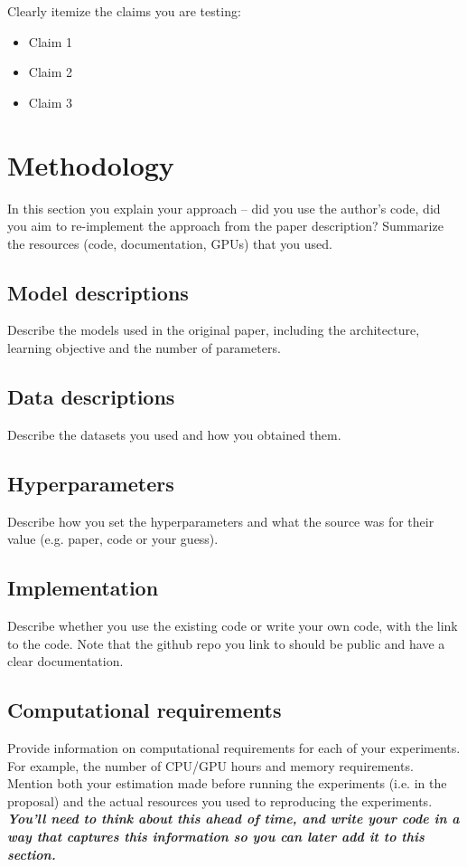 \documentclass[11pt,a4paper]{article}
\begin{document}
Clearly itemize the claims you are testing:
\begin{itemize}
    \item Claim 1
    \item Claim 2
    \item Claim 3
\end{itemize}


\section{Methodology}

In this section you explain your approach -- did you use the author's code, did you aim to re-implement the approach from the paper description? Summarize the resources (code, documentation, GPUs) that you used. 

\subsection{Model descriptions}
Describe the models used in the original paper, including the architecture, learning objective and the number of parameters.

\subsection{Data descriptions}
Describe the datasets you used and how you obtained them. 

\subsection{Hyperparameters}
Describe how you set the hyperparameters and what the source was for their value (e.g. paper, code or your guess). 

\subsection{Implementation}
Describe whether you use the existing code or write your own code, with the link to the code. Note that the github repo you link to should be public and have a clear documentation.

\subsection{Computational requirements}
Provide information on computational requirements for each of your experiments. For example, the number of CPU/GPU hours and memory requirements.
Mention both your estimation made before running the experiments (i.e. in the proposal) and the actual resources you used to reproducing the experiments. 
\textbf{\textit{You'll need to think about this ahead of time, and write your code in a way that captures this information so you can later add it to this section.} }
\end{document}
